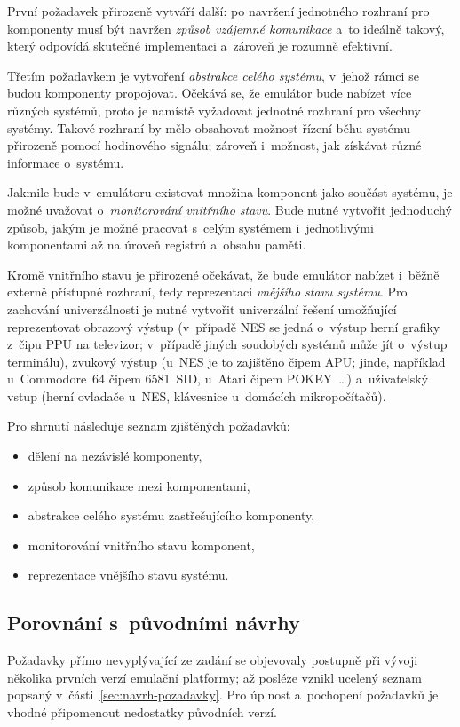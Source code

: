 První požadavek přirozeně vytváří další: po navržení jednotného rozhraní pro komponenty musí být navržen \emph{způsob vzájemné komunikace} a~to ideálně takový, který odpovídá skutečné implementaci a~zároveň je rozumně efektivní.

Třetím požadavkem je vytvoření \emph{abstrakce celého systému}, v~jehož rámci se budou komponenty propojovat. Očekává se, že emulátor bude nabízet více různých systémů, proto je namístě vyžadovat jednotné rozhraní pro všechny systémy. Takové rozhraní by mělo obsahovat možnost řízení běhu systému přirozeně pomocí hodinového signálu; zároveň i~možnost, jak získávat různé informace o~systému.

Jakmile bude v~emulátoru existovat množina komponent jako součást systému, je možné uvažovat o~\emph{monitorování vnitřního stavu}. Bude nutné vytvořit jednoduchý způsob, jakým je možné pracovat s~celým systémem i~jednotlivými komponentami až na úroveň registrů a~obsahu paměti.

Kromě vnitřního stavu je přirozené očekávat, že bude emulátor nabízet i~běžně externě přístupné rozhraní, tedy reprezentaci \emph{vnějšího stavu systému}. Pro zachování univerzálnosti je nutné vytvořit univerzální řešení umožňující reprezentovat obrazový výstup (v~případě NES se jedná o~výstup herní grafiky z~čipu PPU na televizor; v~případě jiných soudobých systémů může jít o~výstup terminálu), zvukový výstup (u~NES je to zajištěno čipem APU; jinde, například u~Commodore~64 čipem 6581~SID, u~Atari čipem POKEY~\dots) a~uživatelský vstup (herní ovladače u~NES, klávesnice u~domácích mikropočítačů).

Pro shrnutí následuje seznam zjištěných požadavků:
\begin{itemize}
	\item dělení na nezávislé komponenty,
	\item způsob komunikace mezi komponentami,
	\item abstrakce celého systému zastřešujícího komponenty,
	\item monitorování vnitřního stavu komponent,
	\item reprezentace vnějšího stavu systému.
\end{itemize}

\subsection{Porovnání s~původními návrhy}
Požadavky přímo nevyplývající ze zadání se objevovaly postupně při vývoji několika prvních verzí emulační platformy; až posléze vznikl ucelený seznam popsaný v~části~\ref{sec:navrh-pozadavky}. Pro úplnost a~pochopení požadavků je vhodné připomenout nedostatky původních verzí.

